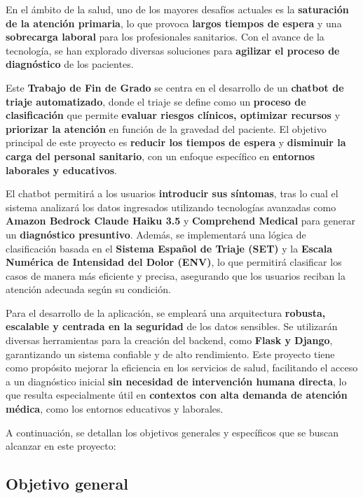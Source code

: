 
En el ámbito de la salud, uno de los mayores desafíos actuales es la \textbf{saturación de la atención primaria}, lo que provoca \textbf{largos tiempos de espera} y una \textbf{sobrecarga laboral} para los profesionales sanitarios. Con el avance de la tecnología, se han explorado diversas soluciones para \textbf{agilizar el proceso de diagnóstico} de los pacientes.  

Este \textbf{Trabajo de Fin de Grado} se centra en el desarrollo de un \textbf{chatbot de triaje automatizado}, donde el triaje se define como un \textbf{proceso de clasificación} que permite \textbf{evaluar riesgos clínicos, optimizar recursos} y \textbf{priorizar la atención} en función de la gravedad del paciente. El objetivo principal de este proyecto es \textbf{reducir los tiempos de espera} y \textbf{disminuir la carga del personal sanitario}, con un enfoque específico en \textbf{entornos laborales y educativos}.  

El chatbot permitirá a los usuarios \textbf{introducir sus síntomas}, tras lo cual el sistema analizará los datos ingresados utilizando tecnologías avanzadas como \textbf{Amazon Bedrock Claude Haiku 3.5} y \textbf{Comprehend Medical} para generar un \textbf{diagnóstico presuntivo}. Además, se implementará una lógica de clasificación basada en el \textbf{Sistema Español de Triaje (SET)} y la \textbf{Escala Numérica de Intensidad del Dolor (ENV)}, lo que permitirá clasificar los casos de manera más eficiente y precisa, asegurando que los usuarios reciban la atención adecuada según su condición.  

Para el desarrollo de la aplicación, se empleará una arquitectura \textbf{robusta, escalable y centrada en la seguridad} de los datos sensibles. Se utilizarán diversas herramientas para la creación del backend, como \textbf{Flask y Django}, garantizando un sistema confiable y de alto rendimiento. Este proyecto tiene como propósito mejorar la eficiencia en los servicios de salud, facilitando el acceso a un diagnóstico inicial \textbf{sin necesidad de intervención humana directa}, lo que resulta especialmente útil en \textbf{contextos con alta demanda de atención médica}, como los entornos educativos y laborales.  

\bigskip
\noindent A continuación, se detallan los objetivos generales y específicos que se buscan alcanzar en este proyecto:

\subsection{Objetivo general}  

